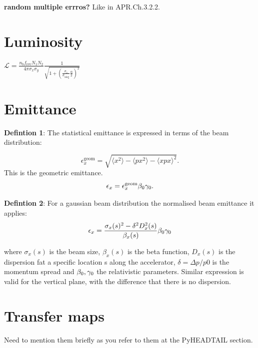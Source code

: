 {{\textbf{random multiple errros? } Like in APR.Ch.3.2.2.

\section{Luminosity}


    $\mathcal{L} = \frac{n_b f_\mathrm{rev}N_1 N_2}{4 \pi \sigma_x \sigma_y} \frac{1}{\sqrt{1+(\frac{\sigma_z}{\sigma_\mathrm{xing}} \frac{\alpha}{2})^2}} $


\section{Emittance}

\textbf{Defintion 1}: The statistical emittance is expressed in terms of the beam distribution: %

\begin{equation}\label{eq:statistical_definition_emit}
    \epsilon_x^{\mathrm{geom}} = \sqrt{\langle x^2 \rangle - \langle px^2 \rangle - \langle x px \rangle^2}.
\end{equation}
This is the geometric emittance. 
\begin{equation}\label{eq:emit_geom_norm_relation}
    \epsilon_x = \epsilon_x^{\mathrm{geom}} {\beta_0} {\gamma_0}.
\end{equation}


\textbf{Defintion 2}:
For a gaussian beam distribution the normalised beam emittance it applies:
\begin{equation}\label{eq:emit_from_beam_size}
    \epsilon_{x} = \frac{\sigma_x(s)^2 - \delta^2 D_x^2(s)}{\beta_x(s)} {\beta_0} {\gamma_0}
\end{equation}

where $\sigma_x(s)$ is the beam size, $\beta_x(s)$ is the beta function, $D_x(s)$ is the dispersion fat a specific location s along the accelerator, $\delta=\Delta p/p0$ is the momentum spread and ${\beta_0}, {\gamma_0}$ the relativistic parameters. Similar expression is valid for the vertical plane, with the difference that there is no dispersion.

\section{Transfer maps}
Need to mention them briefly as you refer to them at the PyHEADTAIL section.

}}
